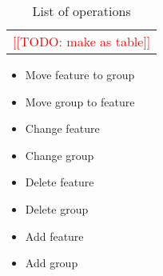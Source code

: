 \documentclass[a4paper,english]{ifimaster}
\newcommand{\todo}[1]{\textcolor{red}{[[TODO: #1]]}\PackageWarning{TODO:}{#1!}}
\begin{document}
\begin{table}[htpb]
	\centering
	\caption{List of operations}
	\label{tab:list_of_operations}
	\begin{tabular}{c}
		\todo{make as table}
	\end{tabular}
	\begin{itemize}
		\item Move feature to group
		\item Move group to feature
		\item Change feature
		\item Change group
		\item Delete feature
		\item Delete group
		\item Add feature
		\item Add group
	\end{itemize}
\end{table}

\backmatter{}

\printbibliography{}
\end{document}
